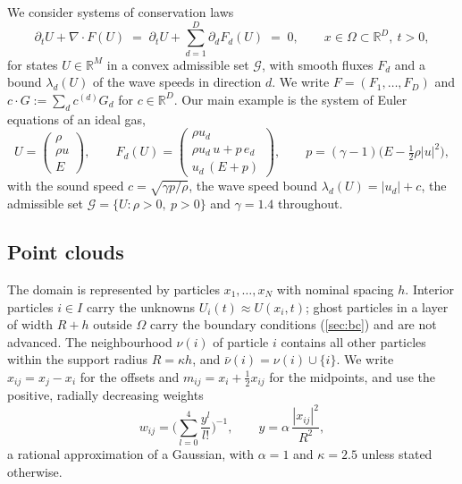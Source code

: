 \documentclass[11pt,a4paper]{article}
\numberwithin{equation}{section}
\newcommand{\R}{\mathbb{R}}
\newcommand{\nb}{\nu}
\newcommand{\cnb}{\bar\nu}
\newcommand{\Ad}{\mathcal{G}}
\begin{document}
We consider systems of conservation laws
\begin{equation}\label{eq:pde}
\partial_t U + \nabla\cdot F(U) \;=\; \partial_t U + \sum_{d=1}^{D} \partial_d F_d(U) \;=\; 0, \qquad x\in\Omega\subset\R^D,\ t>0,
\end{equation}
for states $U\in\R^M$ in a convex admissible set $\Ad$, with smooth fluxes $F_d$ and a bound $\lambda_d(U)$ of the wave speeds in direction $d$. We write $F=(F_1,\dots,F_D)$ and $c\cdot G := \sum_{d} c^{(d)} G_d$ for $c\in\R^D$. Our main example is the system of Euler equations of an ideal gas,
\begin{equation}\label{eq:euler}
U = \begin{pmatrix}\rho\\ \rho u\\ E\end{pmatrix},\qquad
F_d(U) = \begin{pmatrix}\rho u_d\\ \rho u_d\, u + p\, e_d\\ u_d\,(E+p)\end{pmatrix},\qquad
p = (\gamma-1)\Big(E-\tfrac12\rho|u|^2\Big),
\end{equation}
with the sound speed $c=\sqrt{\gamma p/\rho}$, the wave speed bound $\lambda_d(U)=|u_d|+c$, the admissible set $\Ad=\{U:\rho>0,\ p>0\}$ and $\gamma=1.4$ throughout.

\subsection{Point clouds}\label{sec:cloud}

The domain is represented by particles $x_1,\dots,x_N$ with nominal spacing $h$. Interior particles $i\in I$ carry the unknowns $U_i(t)\approx U(x_i,t)$; ghost particles in a layer of width $R+h$ outside $\Omega$ carry the boundary conditions (\cref{sec:bc}) and are not advanced. The neighbourhood $\nb(i)$ of particle $i$ contains all other particles within the support radius $R=\kappa h$, and $\cnb(i)=\nb(i)\cup\{i\}$. We write $x_{ij}=x_j-x_i$ for the offsets and $m_{ij}=x_i+\tfrac12x_{ij}$ for the midpoints, and use the positive, radially decreasing weights
\begin{equation}\label{eq:weight}
w_{ij} = \Big(\sum_{l=0}^{4}\frac{y^l}{l!}\Big)^{-1},\qquad y=\alpha\,\frac{|x_{ij}|^2}{R^2},
\end{equation}
a rational approximation of a Gaussian, with $\alpha=1$ and $\kappa=2.5$ unless stated otherwise.
\end{document}
